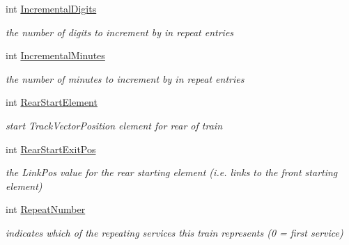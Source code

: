 \begin{DoxyCompactItemize}
\mbox{\label{class_t_train_a7390e5172ab0a5aa998df94953e43fba}} 
int \mbox{\hyperlink{class_t_train_a7390e5172ab0a5aa998df94953e43fba}{Incremental\+Digits}}
\begin{DoxyCompactList}\small\item\em the number of digits to increment by in repeat entries \end{DoxyCompactList}\item 
\mbox{\label{class_t_train_a8601120683e9bf4f26b0d1cba75ceed4}} 
int \mbox{\hyperlink{class_t_train_a8601120683e9bf4f26b0d1cba75ceed4}{Incremental\+Minutes}}
\begin{DoxyCompactList}\small\item\em the number of minutes to increment by in repeat entries \end{DoxyCompactList}\item 
\mbox{\label{class_t_train_a17d0d896f438220698e0b2b47e5112da}} 
int \mbox{\hyperlink{class_t_train_a17d0d896f438220698e0b2b47e5112da}{Rear\+Start\+Element}}
\begin{DoxyCompactList}\small\item\em start Track\+Vector\+Position element for rear of train \end{DoxyCompactList}\item 
\mbox{\label{class_t_train_a469298d2fbbd846e2a62e7a04cfedc34}} 
int \mbox{\hyperlink{class_t_train_a469298d2fbbd846e2a62e7a04cfedc34}{Rear\+Start\+Exit\+Pos}}
\begin{DoxyCompactList}\small\item\em the Link\+Pos value for the rear starting element (i.\+e. links to the front starting element) \end{DoxyCompactList}\item 
\mbox{\label{class_t_train_a459ae11b674cfdccb8872ef25c921fd9}} 
int \mbox{\hyperlink{class_t_train_a459ae11b674cfdccb8872ef25c921fd9}{Repeat\+Number}}
\begin{DoxyCompactList}\small\item\em indicates which of the repeating services this train represents (0 = first service) \end{DoxyCompactList}\item 
\mbox{\label{class_t_train_ad11759e49fa6fcf8367090ef1db490b7}} 

\end{DoxyCompactItemize}

